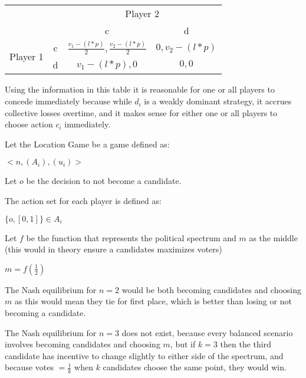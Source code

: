 \documentclass{homework}
\begin{document}
\begin{table}[h]
\begin{tabular}{llll}
                                           	&                       	& \multicolumn{2}{c}{Player 2}                                                                                  	\\ \cline{3-4}
                                           	& \multicolumn{1}{l|}{} 	& \multicolumn{1}{c|}{c}                             	& \multicolumn{1}{c|}{d}                             	\\ \cline{2-4}
\multicolumn{1}{c|}{\multirow{2}{*}{Player 1}} & \multicolumn{1}{c|}{c}  & \multicolumn{1}{c|}{$\frac{v_{1} - (l*p)}{2}, \frac{v_{2} - (l*p)}{2}$}  & \multicolumn{1}{c|}{$0, v_{2} - (l*p)$}  \\ \cline{2-4}
\multicolumn{1}{c|}{}                      	& \multicolumn{1}{c|}{d} & \multicolumn{1}{c|}{$v_{1} - (l*p), 0$} & \multicolumn{1}{c|}{$0, 0$} \\ \cline{2-4}
\end{tabular}
\end{table}

Using the information in this table it is reasonable for one or all players to concede immediately because while $d_{i}$ is a weakly dominant strategy, it accrues collective losses overtime, and it makes sense for either one or all players to choose action $c_{i}$ immediately.

\exercise[19.1]
Let the Location Game be a game defined as:

\indent\hspace{18pt}$<n,(A_{i}),(u_{i})>$

Let $o$ be the decision to not become a candidate.

The action set for each player is defined as:

\indent\hspace{18pt}$\{o, [0,1]\} \in A_{i}$

Let $f$ be the function that represents the political spectrum and $m$ as the middle (this would in theory ensure a candidates maximizes voters)

\indent\hspace{18pt}$m = f(\frac{1}{2})$

The Nash equilibrium  for $n=2$ would be both becoming candidates and choosing $m$ as this would mean they tie for first place, which is better than losing or not becoming a candidate.\ 

The Nash equilibrium  for $n=3$ does not exist, because every balanced scenario involves becoming candidates and choosing $m$, but if $k=3$ then the third candidate has incentive to change slightly to either side of the spectrum, and because votes $=\frac{1}{k}$ when $k$ candidates choose the same point, they would win.
\end{document}
